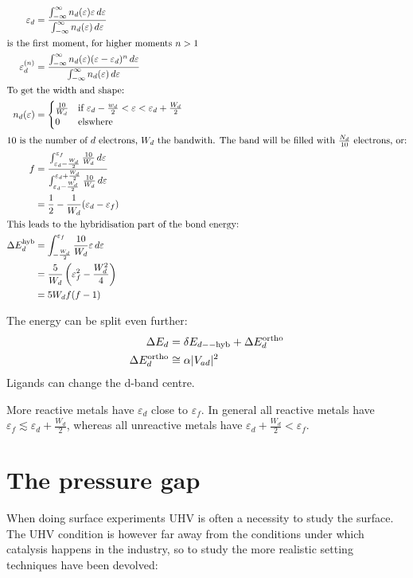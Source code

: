 \documentclass[article,oneside]{memoir}
\begin{document}
\begin{align*}
        \varepsilon_{d}&=\frac{\int_{-\infty}^{\infty}n_{d}(\varepsilon)\varepsilon\,d\varepsilon}{\int_{-\infty}^{\infty}n_{d}(\varepsilon)\,d\varepsilon}\\
        \intertext{is the first moment, for higher moments $n>1$}
        \varepsilon_{d}^{(n)}&=\frac{\int_{-\infty}^{\infty}n_{d}(\varepsilon)(\varepsilon-\varepsilon_{d})^n\,d\varepsilon}{\int_{-\infty}^{\infty}n_{d}(\varepsilon)\,d\varepsilon}\\
        \intertext{To get the width and shape:}
        n_{d}(\varepsilon)&=\begin{cases}\frac{10}{W_d}&\textup{if}\ \varepsilon_{d}-\frac{w_d}{2}<\varepsilon<\varepsilon_{d}+\frac{W_d}{2}\\0&\textup{elswhere}\end{cases}\\
        \intertext{10 is the number of $d$ electrons, $W_{d}$ the bandwith. The band will be filled with $\frac{N_d}{10}$ electrons, or:}
        f&=\frac{\int_{\varepsilon_d-\frac{W_{d}}{2}}^{\varepsilon_{f}}\frac{10}{W_d}\,d\varepsilon}{\int_{\varepsilon_d-\frac{W_{d}}{2}}^{\varepsilon_{d}+\frac{W_{d}}{2}}\frac{10}{W_d}\,d\varepsilon}\\
        &=\frac{1}{2}-\frac{1}{W_d}(\varepsilon_{d}-\varepsilon_{f})\\
        \intertext{This leads to the hybridisation part of the bond energy:}
        \Delta E_{d}^{\textup{hyb}} &= \int_{-\frac{W_d}{2}}^{\varepsilon_{f}}\frac{10}{W_d}\varepsilon\,d\varepsilon\\
        &=\frac{5}{W_d}\left(\varepsilon_{f}^{2}-\frac{W_{d}^2}{4}\right)\\
        &=5W_{d}f(f-1)
\end{align*}

The energy can be split even further:
\begin{align*}
        \Delta E_{d}&=\delta E_{d--\textup{hyb}} +\Delta E_{d}^{\textup{ortho}}\\
        \Delta E_{d}^{\textup{ortho}}&\cong \alpha\lvert V_{ad}\rvert^2
\end{align*}
Ligands can change the d-band centre.

More reactive metals have $\varepsilon_{d}$ close to $\varepsilon_{f}$. In general all reactive metals have $\varepsilon_{f}\lesssim\varepsilon_{d}+\frac{W_{d}}{2}$, whereas all unreactive metals have $\varepsilon_{d}+\frac{W_{d}}{2}<\varepsilon_{f}$.
\chapter{The pressure gap}
When doing surface experiments UHV is often a necessity to study the surface. The UHV condition is however far away from the conditions under which catalysis happens in the industry, so to study the more realistic setting techniques have been devolved:
\end{document}
